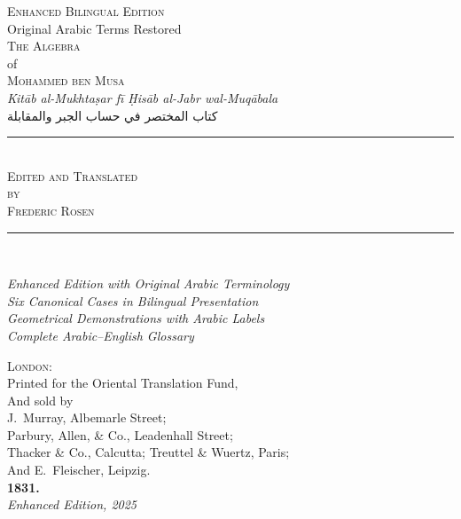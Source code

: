 \thispagestyle{empty}
\begin{center}
\vspace*{1.5cm}

{\fontsize{12}{14}\selectfont\scshape\color{notecolor} Enhanced Bilingual Edition}\\[0.3cm]
{\fontsize{10}{12}\selectfont\color{notecolor} Original Arabic Terms Restored}\\[1cm]

{\fontsize{28}{34}\selectfont\scshape\color{titlecolor} The Algebra}\\[0.8cm]
{\fontsize{14}{18}\selectfont\color{sectioncolor} of}\\[0.8cm]
{\fontsize{28}{34}\selectfont\scshape\color{titlecolor} Mohammed ben Musa}\\[0.5cm]

{\large\color{sectioncolor}
\textit{Kit\=ab al-Mukhta\d{s}ar f\=i \d{H}is\=ab al-Jabr wal-Muq\=abala}}\\[0.3cm]
{\normalsize\arabicfont\beginR كتاب المختصر في حساب الجبر والمقابلة\endR}\\[1.5cm]

\rule{0.5\textwidth}{1pt}\\[1cm]

{\Large\scshape Edited and Translated}\\[0.3cm]
{\Large\scshape by}\\[0.3cm]
{\Large\scshape Frederic Rosen}\\[1.5cm]

\rule{0.5\textwidth}{1pt}\\[1cm]

\begin{minipage}{0.75\textwidth}
\centering
\small\color{prefacecolor}
\textit{Enhanced Edition with Original Arabic Terminology}\\[0.2cm]
\textit{Six Canonical Cases in Bilingual Presentation}\\[0.2cm]
\textit{Geometrical Demonstrations with Arabic Labels}\\[0.2cm]
\textit{Complete Arabic--English Glossary}
\end{minipage}

\vspace{1cm}

{\normalsize
\textsc{London}:\\
Printed for the Oriental Translation Fund,\\
And sold by\\
J.~Murray, Albemarle Street;\\
Parbury, Allen, \& Co., Leadenhall Street;\\
Thacker \& Co., Calcutta; Treuttel \& Wuertz, Paris;\\
And E.~Fleischer, Leipzig.\\[0.5cm]
\textbf{1831.}
}\\[0.8cm]

{\small\textit{Enhanced Edition, 2025}}

\vfill
\end{center}
\clearpage

